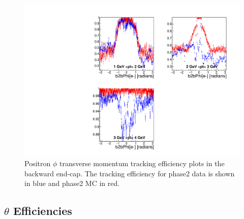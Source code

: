 \documentclass[a4paper,11pt,twosided,final,german,openbib,pdftex,listof=totoc,bibliography=totoc]{scrbook}
\begin{document}
\begin{figure}[!htbp]
	\centering
	\includegraphics[width=\textwidth]{Plots/master/xPtMPhiepEC}
	\caption[Transverse Momentum $\phi$ Positron Backward End-Cap Efficiency Phase2]{Positron $\phi$ transverse momentum tracking efficiency plots in the backward end-cap. The tracking efficiency for phase2 data is shown in blue and phase2 MC in red.
		\label{plt:xPtMPhiepEC}	}
\end{figure}

\newpage











\subsection{$\theta$ Efficiencies}
\end{document}
